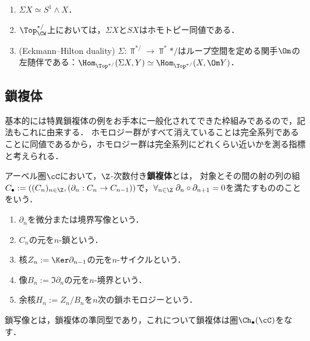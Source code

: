 \documentclass[uplatex, dvipdfmx]{jsreport}
\begin{document}
\begin{lemma}[約懸垂の表示]\mbox{}
    \begin{enumerate}
        \item $\Sigma X\simeq S^1\wedge X$．
        \item $\Top_\CW^{*/}$上においては，$\Sigma X$と$SX$はホモトピー同値である．
        \item (Eckmann–Hilton duality) $\Sigma:\Top^{*/}\to\Top^*{*/}$はループ空間を定める関手$\Om$の左随伴である：$\Hom_{\Top^{*/}}(\Sigma X,Y)\simeq\Hom_{\Top^{*/}}(X,\Om Y)$．
    \end{enumerate}
\end{lemma}

\subsection{鎖複体}

\begin{tcolorbox}[colframe=ForestGreen, colback=ForestGreen!10!white,breakable,colbacktitle=ForestGreen!40!white,coltitle=black,fonttitle=\bfseries\sffamily,
title=]
    基本的には特異鎖複体の例をお手本に一般化されてできた枠組みであるので，記法もこれに由来する．
    ホモロジー群がすべて消えていることは完全系列であることに同値であるから，ホモロジー群は完全系列にどれくらい近いかを測る指標と考えられる．
\end{tcolorbox}

\begin{definition}
    アーベル圏$\cC$において，$\Z$-次数付き\textbf{鎖複体}とは，
    対象とその間の射の列の組$C_\bullet:=((C_n)_{n\in\Z},(\partial_n:C_n\to C_{n-1}))$で，$\forall_{n\in\Z}\;\partial_n\circ\partial_{n+1}=0$を満たすもののことをいう．
    \begin{enumerate}
        \item $\partial_n$を微分または境界写像という．
        \item $C_n$の元を$n$-鎖という．
        \item 核$Z_n:=\Ker\partial_{n-1}$の元を$n$-サイクルという．
        \item 像$B_n:=\Im\partial_n$の元を$n$-境界という．
        \item 余核$H_n:=Z_n/B_n$を$n$次の鎖ホモロジーという．
    \end{enumerate}
\end{definition}

\begin{definition}
    鎖写像とは，鎖複体の準同型であり，これについて鎖複体は圏$\Ch_\bullet(\cC)$をなす．
\end{definition}
\end{document}
